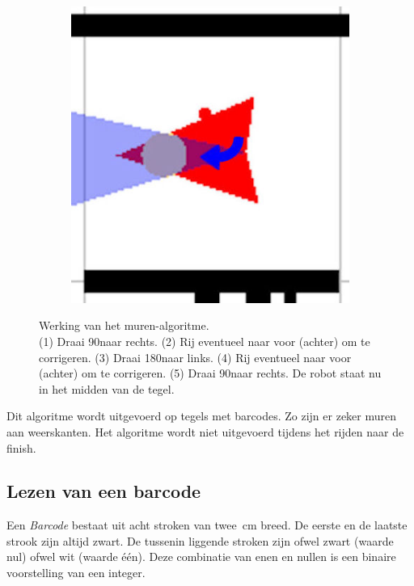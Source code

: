 \documentclass[eind]{penoverslag}
\begin{document}
\begin{figure}
\begin{subfigure}[hb]{0.2\textwidth}
        \end{subfigure}%
        \begin{subfigure}[hb]{0.2\textwidth}
                \centering
                \includegraphics[width=\textwidth]{muur6}
        \end{subfigure}
 \caption[Werking van het muren-algoritme.]{Werking van het muren-algoritme.\\(1) Draai 90\degree naar rechts. (2) Rij eventueel naar voor (achter) om te corrigeren. (3) Draai 180\degree naar links. (4) Rij eventueel naar voor (achter) om te corrigeren. (5) Draai 90\degree naar rechts. De robot staat nu in het midden van de tegel.}
\label{fig:algoMuur}
\end{figure}

Dit algoritme wordt uitgevoerd op tegels met barcodes. Zo zijn er zeker muren aan weerskanten. Het algoritme wordt niet uitgevoerd tijdens het rijden naar de finish.

\subsection{Lezen van een barcode} %
\label{ssec:algoBarcode}
Een \textit{Barcode} bestaat uit acht stroken van twee~cm breed. De eerste en de laatste strook zijn altijd zwart. De tussenin liggende stroken zijn ofwel zwart (waarde nul) ofwel wit (waarde \'e\'en). Deze combinatie van enen en nullen is een binaire voorstelling van een integer.
\end{document}

